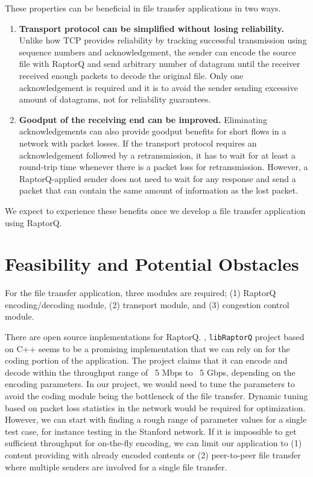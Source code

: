 \documentclass{sig-alternate-10pt}
\begin{document}
These properties can be beneficial in file transfer applications in two ways.
\begin{enumerate}[label=(\alph*)]
  \item \textbf{Transport protocol can be simplified without losing
  reliability.}
  Unlike how TCP provides reliability by tracking successful transmission using
  sequence numbers and acknowledgement, the sender can encode the source file
  with RaptorQ and send arbitrary number of datagram until the receiver received
  enough packets to decode the original file. Only one acknowledgement is
  required and it is to avoid the sender sending excessive amount of datagrams,
  not for reliability guarantees.
  \item \textbf{Goodput of the receiving end can be improved.}
  Eliminating acknowledgements can also provide goodput benefits for short flows
  in a network with packet losses. If the transport protocol requires an
  acknowledgement followed by a retransmission, it has to wait for at least a
  round-trip time whenever there is a packet loss for retransmission. However,
  a RaptorQ-applied sender does not need to wait for any response and send a
  packet that can contain the same amount of information as the lost packet.
\end{enumerate}

We expect to experience these benefits once we develop a file transfer
application using RaptorQ.

\section{Feasibility and Potential Obstacles}
For the file transfer application, three modules are required; (1) RaptorQ
encoding/decoding module, (2) transport module, and (3) congestion control
module. 

There are open source implementations for RaptorQ. \cite{openrq},
\cite{libraptorq} \texttt{libRaptorQ} project \cite{libraptorq} based on C++
seems to be a promising implementation that we can rely on for the coding
portion of the application. The project claims that it can encode and decode
within the throughput range of ~5 Mbps to ~5 Gbps, depending on the encoding
parameters. In our project, we would need to tune the parameters to avoid the
coding module being the bottleneck of the file transfer.  Dynamic tuning based
on packet loss statistics in the network would be required for optimization.
However, we can start with finding a rough range of parameter values for a
single test case, for instance testing in the Stanford network. If it is
impossible to get sufficient throughput for on-the-fly encoding, we can limit
our application to (1) content providing with already encoded contents or (2)
peer-to-peer file transfer where multiple senders are involved for a single file
transfer.
\end{document}
